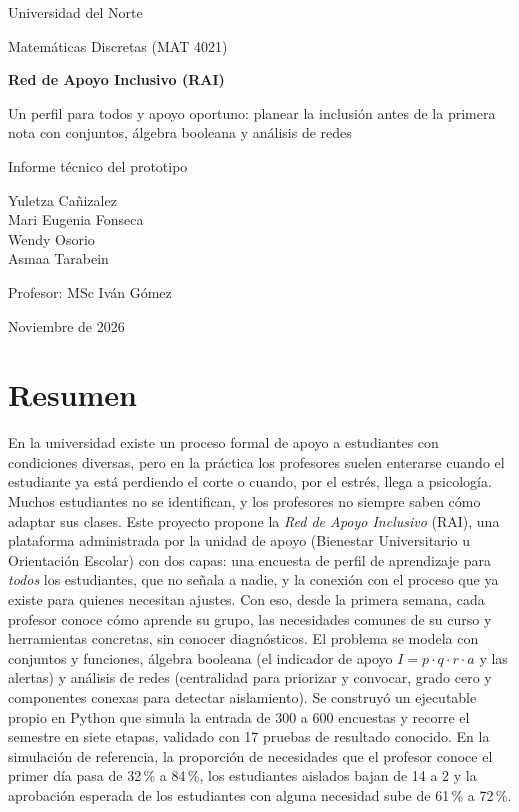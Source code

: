 \documentclass[12pt,letterpaper]{article}
\begin{document}
\begin{titlepage}
\centering
\vspace*{1.5cm}
{\Large Universidad del Norte\par}
{\large Matemáticas Discretas (MAT 4021)\par}
\vspace{2.5cm}
{\LARGE\bfseries Red de Apoyo Inclusivo (RAI)\par}
\vspace{0.4cm}
{\Large Un perfil para todos y apoyo oportuno: planear la inclusión antes de la primera nota con conjuntos, álgebra booleana y análisis de redes\par}
\vspace{0.6cm}
{\large Informe técnico del prototipo\par}
\vfill
{\large
Yuletza Cañizalez\\
Mari Eugenia Fonseca\\
Wendy Osorio\\
Asmaa Tarabein\par}
\vspace{1cm}
{\large Profesor: MSc Iván Gómez\par}
{\large Noviembre de 2026\par}
\end{titlepage}
\setcounter{page}{2}

\section*{Resumen}
En la universidad existe un proceso formal de apoyo a estudiantes con condiciones diversas, pero en la práctica los profesores suelen enterarse cuando el estudiante ya está perdiendo el corte o cuando, por el estrés, llega a psicología. Muchos estudiantes no se identifican, y los profesores no siempre saben cómo adaptar sus clases. Este proyecto propone la \emph{Red de Apoyo Inclusivo} (RAI), una plataforma administrada por la unidad de apoyo (Bienestar Universitario u Orientación Escolar) con dos capas: una encuesta de perfil de aprendizaje para \emph{todos} los estudiantes, que no señala a nadie, y la conexión con el proceso que ya existe para quienes necesitan ajustes. Con eso, desde la primera semana, cada profesor conoce cómo aprende su grupo, las necesidades comunes de su curso y herramientas concretas, sin conocer diagnósticos. El problema se modela con conjuntos y funciones, álgebra booleana (el indicador de apoyo $I = p\cdot q\cdot r\cdot a$ y las alertas) y análisis de redes (centralidad para priorizar y convocar, grado cero y componentes conexas para detectar aislamiento). Se construyó un ejecutable propio en Python que simula la entrada de 300 a 600 encuestas y recorre el semestre en siete etapas, validado con 17 pruebas de resultado conocido. En la simulación de referencia, la proporción de necesidades que el profesor conoce el primer día pasa de 32\,\% a 84\,\%, los estudiantes aislados bajan de 14 a 2 y la aprobación esperada de los estudiantes con alguna necesidad sube de 61\,\% a 72\,\%.
\end{document}
